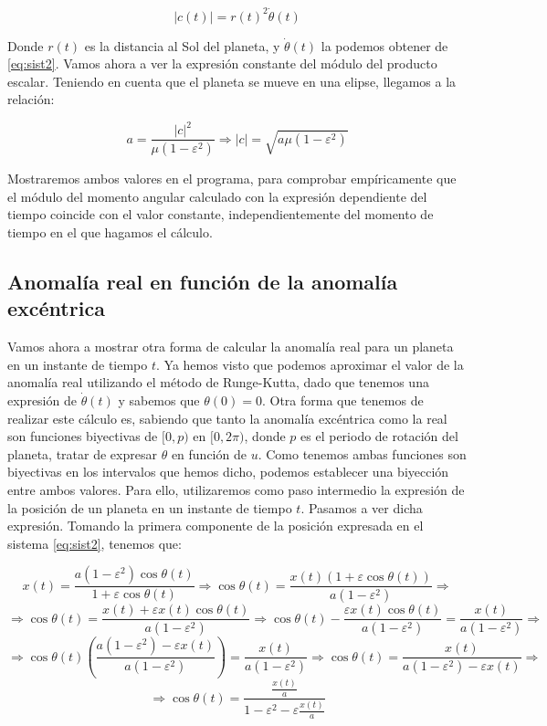 \documentclass[12pt]{article}
\begin{document}
\[
|c(t)| = r(t)^2\dot{\theta}(t)
\]

Donde $r(t)$ es la distancia al Sol del planeta, y $\dot{\theta}(t)$
la podemos obtener de \ref{eq:sist2}. Vamos ahora a ver la expresión
constante del módulo del producto escalar. Teniendo en cuenta que el
planeta se mueve en una elipse, llegamos a la relación:

\[
a = \frac{|c|^2}{\mu(1 - \varepsilon^2)} \Rightarrow |c| =
\sqrt{a\mu(1 - \varepsilon^2)}
\]

Mostraremos ambos valores en el programa, para comprobar empíricamente
que el módulo del momento angular calculado con la expresión
dependiente del tiempo coincide con el valor constante,
independientemente del momento de tiempo en el que hagamos el cálculo.

\subsection{Anomalía real en función de la anomalía excéntrica}

Vamos ahora a mostrar otra forma de calcular la anomalía real para un
planeta en un instante de tiempo $t$. Ya hemos visto que podemos
aproximar el valor de la anomalía real utilizando el método de
Runge-Kutta, dado que tenemos una expresión de $\dot{\theta}(t)$ y
sabemos que $\theta(0) = 0$. Otra forma que tenemos de realizar este
cálculo es, sabiendo que tanto la anomalía excéntrica como la real son
funciones biyectivas de $[0, p)$ en $[0, 2\pi)$, donde $p$ es el
periodo de rotación del planeta, tratar de expresar $\theta$ en
función de $u$. Como tenemos ambas funciones son biyectivas en los
intervalos que hemos dicho, podemos establecer una biyección entre
ambos valores.  Para ello, utilizaremos como paso intermedio la
expresión de la posición de un planeta en un instante de tiempo
$t$. Pasamos a ver dicha expresión.  Tomando la primera componente de
la posición expresada en el sistema \ref{eq:sist2}, tenemos que:

\[
x(t) = \frac{a(1 - \varepsilon^2)\cos{\theta(t)}}{1 +
  \varepsilon\cos{\theta(t)}} \Rightarrow \cos{\theta(t)} =
\frac{x(t)(1 + \varepsilon\cos{\theta(t)})}{a(1 - \varepsilon^2)}
\Rightarrow
\]
\[
\Rightarrow \cos{\theta(t)} = \frac{x(t) + \varepsilon x(t)
  \cos{\theta(t)}} {a(1 - \varepsilon^2)} \Rightarrow \cos{\theta(t)}
- \frac{\varepsilon x(t) \cos{\theta(t)}} {a(1 - \varepsilon^2)} =
\frac{x(t)}{a(1 - \varepsilon^2)} \Rightarrow
\]
\[
\Rightarrow \cos{\theta(t)}\left(\frac{a(1 - \varepsilon^2) -
    \varepsilon x(t)}{a(1 - \varepsilon^2)}\right) = \frac{x(t)}{a(1 -
  \varepsilon^2)} \Rightarrow \cos{\theta(t)} = \frac{x(t)}{a(1 -
  \varepsilon^2) - \varepsilon x(t)} \Rightarrow
\]
\[
\Rightarrow \cos{\theta(t)} = \frac{\frac{x(t)}{a}}{1 - \varepsilon^2
  - \varepsilon \frac{x(t)}{a}}
\]
\end{document}
